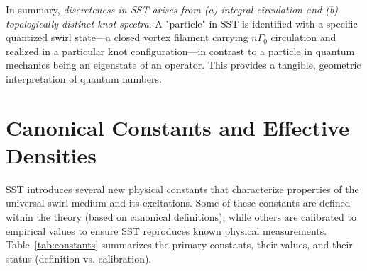 \documentclass[10pt,reprint,aps,onecolumn,nofootinbib]{revtex4-2}
\begin{document}
        In summary, \emph{discreteness in SST arises from (a) integral circulation and (b) topologically distinct knot spectra}. A "particle" in SST is identified with a specific quantized swirl state—a closed vortex filament carrying $n\Gamma_0$ circulation and realized in a particular knot configuration—in contrast to a particle in quantum mechanics being an eigenstate of an operator. This provides a tangible, geometric interpretation of quantum numbers.



    \section{Canonical Constants and Effective Densities}
    SST introduces several new physical constants that characterize properties of the universal swirl medium and its excitations. Some of these constants are defined within the theory (based on canonical definitions), while others are calibrated to empirical values to ensure SST reproduces known physical measurements. Table~\ref{tab:constants} summarizes the primary constants, their values, and their status (definition vs. calibration).
\end{document}
